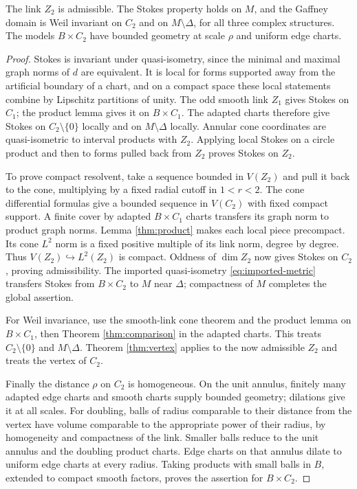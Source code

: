 \begin{proposition}\label{prop:models}
The link $Z_2$ is admissible. The Stokes property holds on $M$,
and the Gaffney domain is Weil invariant on $C_2$ and on
$M\setminus\Delta$, for all three complex structures.
The models $B\times C_2$ have bounded geometry at scale $\rho$
and uniform edge charts.
\end{proposition}
\begin{proof}
Stokes is invariant under quasi-isometry, since the minimal and
maximal graph norms of $d$ are equivalent. It is local for forms
supported away from the artificial boundary of a chart, and on a
compact space these local statements combine by Lipschitz
partitions of unity. The odd smooth link $Z_1$ gives Stokes on
$C_1$; the product lemma gives it on $B\times C_1$. The adapted
charts therefore give Stokes on $C_2\setminus\{0\}$ locally
and on $M\setminus\Delta$ locally. Annular cone coordinates
are quasi-isometric to interval products with $Z_2$. Applying
local Stokes on a circle product and then to forms pulled back
from $Z_2$ proves Stokes on $Z_2$.

To prove compact resolvent, take a sequence bounded in $V(Z_2)$
and pull it back to the cone, multiplying by a fixed radial cutoff
in $1<r<2$. The cone differential formulas give a bounded
sequence in $V(C_2)$ with fixed compact support. A finite cover
by adapted $B\times C_1$ charts transfers its graph norm to
product graph norms. Lemma \ref{thm:product} makes each local
piece precompact. Its cone $L^2$ norm is a fixed positive
multiple of its link norm, degree by degree. Thus
$V(Z_2)\hookrightarrow L^2(Z_2)$ is compact. Oddness of
$\dim Z_2$ now gives Stokes on $C_2$, proving admissibility.
The imported quasi-isometry \eqref{eq:imported-metric} transfers
Stokes from $B\times C_2$ to $M$ near $\Delta$; compactness
of $M$ completes the global assertion.

For Weil invariance, use the smooth-link cone theorem and the
product lemma on $B\times C_1$, then Theorem
\ref{thm:comparison} in the adapted charts. This treats
$C_2\setminus\{0\}$ and $M\setminus\Delta$. Theorem
\ref{thm:vertex} applies to the now admissible $Z_2$ and treats
the vertex of $C_2$.

Finally the distance $\rho$ on $C_2$ is homogeneous. On the
unit annulus, finitely many adapted edge charts and smooth
charts supply bounded geometry; dilations give it at all
scales. For doubling, balls of radius comparable to their
distance from the vertex have volume comparable to the
appropriate power of their radius, by homogeneity and compactness
of the link. Smaller balls reduce to the unit annulus and the
doubling product charts. Edge charts on that annulus dilate to
uniform edge charts at every radius. Taking products with
small balls in $B$, extended to compact smooth factors, proves
the assertion for $B\times C_2$.
\end{proof}
